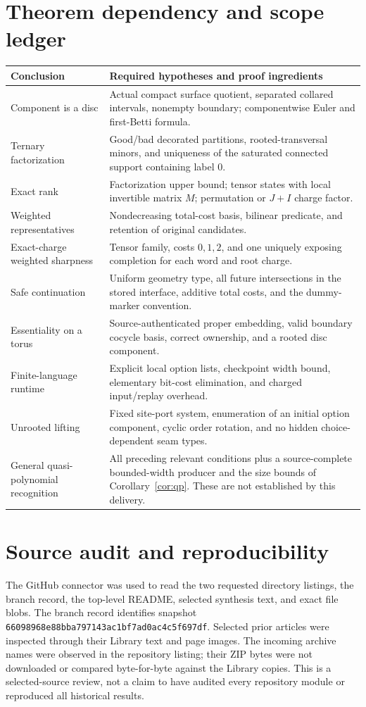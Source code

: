 \documentclass[11pt,letterpaper]{article}
\theoremstyle{definition}
\newcommand{\pin}{\texttt{66098968e88bba797143ac1bf7ad0ac4c5f697df}}
\begin{document}
\section{Theorem dependency and scope ledger}
\small
\begin{longtable}{>{\raggedright\arraybackslash}p{}>{\raggedright\arraybackslash}p{}}
\toprule
Conclusion & Required hypotheses and proof ingredients\\\midrule
\endhead
Component is a disc & Actual compact surface quotient, separated collared intervals, nonempty boundary; componentwise Euler and first-Betti formula.\\
Ternary factorization & Good/bad decorated partitions, rooted-transversal minors, and uniqueness of the saturated connected support containing label $0$.\\
Exact rank & Factorization upper bound; tensor states with local invertible matrix $M$; permutation or $J+I$ charge factor.\\
Weighted representatives & Nondecreasing total-cost basis, bilinear predicate, and retention of original candidates.\\
Exact-charge weighted sharpness & Tensor family, costs $0,1,2$, and one uniquely exposing completion for each word and root charge.\\
Safe continuation & Uniform geometry type, all future intersections in the stored interface, additive total costs, and the dummy-marker convention.\\
Essentiality on a torus & Source-authenticated proper embedding, valid boundary cocycle basis, correct ownership, and a rooted disc component.\\
Finite-language runtime & Explicit local option lists, checkpoint width bound, elementary bit-cost elimination, and charged input/replay overhead.\\
Unrooted lifting & Fixed site-port system, enumeration of an initial option component, cyclic order rotation, and no hidden choice-dependent seam types.\\
General quasi-polynomial recognition & All preceding relevant conditions plus a source-complete bounded-width producer and the size bounds of Corollary~\ref{cor:qp}. These are not established by this delivery.\\\bottomrule
\end{longtable}
\normalsize

\section{Source audit and reproducibility}
The GitHub connector was used to read the two requested directory listings, the branch record, the top-level README, selected synthesis text, and exact file blobs. The branch record identifies snapshot \pin. Selected prior articles were inspected through their Library text and page images. The incoming archive names were observed in the repository listing; their ZIP bytes were not downloaded or compared byte-for-byte against the Library copies. This is a selected-source review, not a claim to have audited every repository module or reproduced all historical results.
\end{document}
